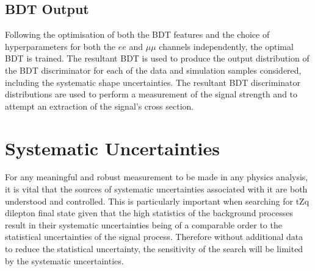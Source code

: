 %

\subsection{BDT Output}
Following the optimisation of both the BDT features and the choice of hyperparameters for both the $ee$ and $\mu\mu$ channels independently, the optimal BDT is trained.
The resultant BDT is used to produce the output distribution of the BDT discriminator for each of the data and simulation samples considered, including the systematic shape uncertainties.
The resultant BDT discriminator distributions are used to perform a measurement of the signal strength and to attempt an extraction of the signal's cross section.

\section{Systematic Uncertainties}\label{sec:systematics}
For any meaningful and robust measurement to be made in any physics analysis, it is vital that the sources of systematic uncertainties associated with it are both understood and controlled.
This is particularly important when searching for tZq dilepton final state given that the high statistics of the background processes result in their systematic uncertainties being of a comparable order to the statistical uncertainties of the signal process.
Therefore without additional data to reduce the statistical uncertainty, the sensitivity of the search will be limited by the systematic uncertainties.

